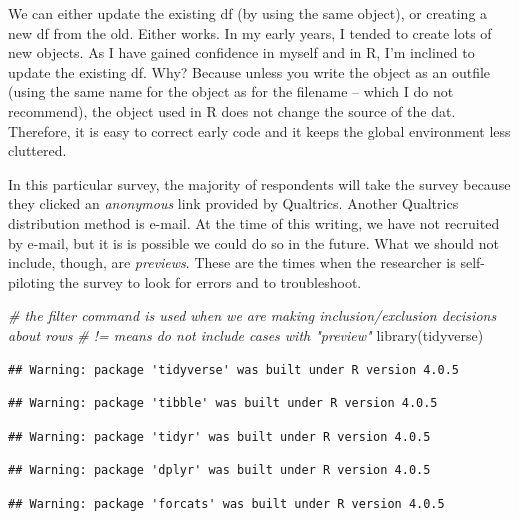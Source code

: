 \documentclass[
  english,
]{book}
\newenvironment{Shaded}{\begin{snugshade}}{\end{snugshade}}
\newcommand{\CommentTok}[1]{\textcolor[rgb]{0.56,0.35,0.01}{\textit{#1}}}
\newcommand{\FunctionTok}[1]{\textcolor[rgb]{0.00,0.00,0.00}{#1}}
\newcommand{\NormalTok}[1]{#1}
\begin{document}
We can either update the existing df (by using the same object), or creating a new df from the old. Either works. In my early years, I tended to create lots of new objects. As I have gained confidence in myself and in R, I'm inclined to update the existing df. Why? Because unless you write the object as an outfile (using the same name for the object as for the filename -- which I do not recommend), the object used in R does not change the source of the dat. Therefore, it is easy to correct early code and it keeps the global environment less cluttered.

In this particular survey, the majority of respondents will take the survey because they clicked an \emph{anonymous} link provided by Qualtrics. Another Qualtrics distribution method is e-mail. At the time of this writing, we have not recruited by e-mail, but it is is possible we could do so in the future. What we should not include, though, are \emph{previews}. These are the times when the researcher is self-piloting the survey to look for errors and to troubleshoot.

\begin{Shaded}
\begin{Highlighting}[]
\CommentTok{\# the filter command is used when we are making inclusion/exclusion decisions about rows}
\CommentTok{\# != means do not include cases with "preview"}
\FunctionTok{library}\NormalTok{(tidyverse)}
\end{Highlighting}
\end{Shaded}

\begin{verbatim}
## Warning: package 'tidyverse' was built under R version 4.0.5
\end{verbatim}

\begin{verbatim}
## Warning: package 'tibble' was built under R version 4.0.5
\end{verbatim}

\begin{verbatim}
## Warning: package 'tidyr' was built under R version 4.0.5
\end{verbatim}

\begin{verbatim}
## Warning: package 'dplyr' was built under R version 4.0.5
\end{verbatim}

\begin{verbatim}
## Warning: package 'forcats' was built under R version 4.0.5
\end{verbatim}
\end{document}
